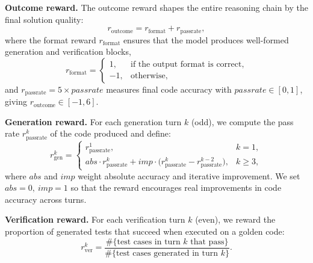 \documentclass{article} %
\begin{document}
\noindent\textbf{Outcome reward.}
The outcome reward shapes the entire reasoning chain by the final solution quality:
\begin{equation}
r_{\mathrm{outcome}} = r_{\mathrm{format}} + r_{\mathrm{passrate}},
\end{equation}
where the format reward $r_{\mathrm{format}}$ ensures that the model produces well-formed generation and verification blocks,
\begin{equation}
r_{\mathrm{format}} = 
\begin{cases}
1, & \text{if the output format is correct},\\
-1, & \text{otherwise},
\end{cases}
\end{equation}
and $r_{\mathrm{passrate}} = 5 \times \mathit{passrate}$ measures final code accuracy with $\mathit{passrate}\in[0,1]$, giving $r_{\mathrm{outcome}}\in[-1,6]$.

\noindent\textbf{Generation reward.}
For each generation turn $k$ (odd), we compute the pass rate $r_{\mathrm{passrate}}^k$ of the code produced and define:
\[
r_{\mathrm{gen}}^k =
\begin{cases}
r_{\mathrm{passrate}}^1, & k = 1,\\[6pt]
\mathit{abs}\cdot r_{\mathrm{passrate}}^k + \mathit{imp}\cdot \bigl(r_{\mathrm{passrate}}^k - r_{\mathrm{passrate}}^{k-2}\bigr), & k \ge 3,
\end{cases}
\]
where $\mathit{abs}$ and $\mathit{imp}$ weight absolute accuracy and iterative improvement. We set $\mathit{abs}=0,\ \mathit{imp}=1$ so that the reward encourages real improvements in code accuracy across turns.

\noindent\textbf{Verification reward.}
For each verification turn $k$ (even), we reward the proportion of generated tests that succeed when executed on a golden code:
\begin{equation}
r_{\mathrm{ver}}^k = \frac{\#\{\text{test cases in turn }k\text{ that pass}\}}
                           {\#\{\text{test cases generated in turn }k\}}.
\end{equation}

\end{document}
